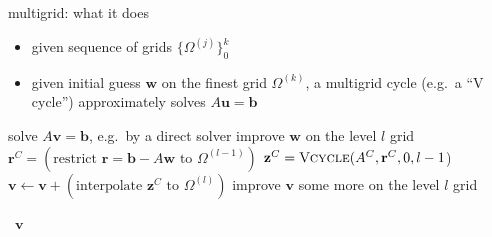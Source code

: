 \documentclass[hide notes,intlimits,usenames,dvipsnames]{beamer}
\newcommand{\bb}{\mathbf{b}}
\newcommand{\br}{\mathbf{r}}
\newcommand{\bu}{\mathbf{u}}
\newcommand{\bv}{\mathbf{v}}
\newcommand{\bw}{\mathbf{w}}
\newcommand{\bz}{\mathbf{z}}
\begin{document}
\begin{frame}{multigrid: what it does}

\begin{itemize}
\item given sequence of grids $\{\Omega^{(j)}\}_0^k$ \quad \begin{tikzpicture}[scale=0.75,baseline]

\end{tikzpicture}
\item given initial guess $\bw$ on the finest grid $\Omega^{(k)}$, a multigrid cycle (e.g.~a ``V cycle'') approximately solves $A \bu = \bb$
\end{itemize}

\begin{minipage}[t]{75mm}
\begin{algorithmic}
\footnotesize
\Function{Vcycle}{$A,\bb,\bw,l$}
        \State solve $A \bv = \bb$, e.g.~by a direct solver
    \Else
        \State improve $\bw$ on the level $l$ grid
        \State $\br^C = \left(\text{restrict } \br = \bb - A \bw \text{ to } \Omega^{(l-1)}\right)$
        \State $\bz^C = \text{\textsc{Vcycle}}(A^C,\br^C,0,l-1$)
        \State $\bv \gets \bv + \left(\text{interpolate } \bz^C \text{ to } \Omega^{(l)}\right)$
        \State improve $\bv$ some more on the level $l$ grid
    \EndIf

    \noindent \quad\, \Return $\bv$
\EndFunction
\end{algorithmic}
\end{minipage}
\quad
\begin{minipage}[t]{25mm}
\vspace{0mm}


\end{minipage}
\end{frame}
\end{document}
